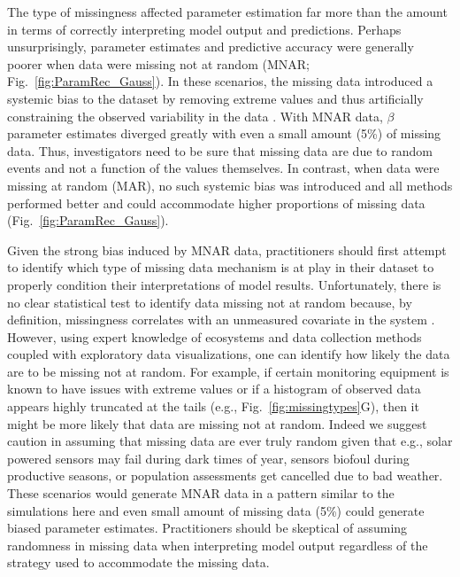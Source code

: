 The type of missingness affected parameter estimation far more than the amount in terms of correctly interpreting model output and predictions. Perhaps unsurprisingly, parameter estimates and predictive accuracy were generally poorer when data were missing not at random (MNAR; Fig.~\ref{fig:ParamRec_Gauss}). In these scenarios, the missing data introduced a systemic bias to the dataset by removing extreme values and thus artificially constraining the observed variability in the data \citep{rubin_inference_1976}. With MNAR data, $\beta$ parameter estimates diverged greatly with even a small amount (5\%) of missing data. Thus, investigators need to be sure that missing data are due to random events and not a function of the values themselves.  In contrast, when data were missing at random (MAR), no such systemic bias was introduced and all methods performed better and could accommodate higher proportions of missing data (Fig.~\ref{fig:ParamRec_Gauss}). 

Given the strong bias induced by MNAR data, practitioners should first attempt to identify which type of missing data mechanism is at play in their dataset to properly condition their interpretations of model results. Unfortunately, there is no clear statistical test to identify data missing not at random because, by definition, missingness correlates with an unmeasured covariate in the system \citep{van2018flexible}. However, using expert knowledge of ecosystems and data collection methods coupled  with  exploratory data visualizations, one can identify how likely the data are to be missing not at random. For example, if certain monitoring equipment is known to have issues with extreme values or if a histogram of observed data appears highly truncated at the tails (e.g., Fig.\ \ref{fig:missingtypes}G), then it might be more likely that data are missing not at random.  Indeed we suggest caution in assuming that missing data are ever truly random given that e.g., solar powered sensors may fail during dark times of year, sensors biofoul during productive seasons, or population assessments get cancelled due to bad weather.   These scenarios would generate MNAR data in a pattern similar to the simulations here and even small amount of missing data (5\%) could generate biased parameter estimates.  Practitioners should be skeptical of assuming randomness in missing data when interpreting model output regardless of the strategy used to accommodate the missing data.

